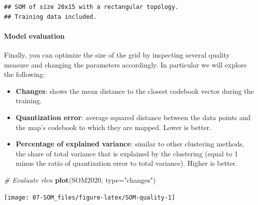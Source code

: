 \documentclass[
]{article}
\newenvironment{Shaded}{\begin{snugshade}}{\end{snugshade}}
\newcommand{\AttributeTok}[1]{\textcolor[rgb]{0.13,0.29,0.53}{#1}}
\newcommand{\CommentTok}[1]{\textcolor[rgb]{0.56,0.35,0.01}{\textit{#1}}}
\newcommand{\DocumentationTok}[1]{\textcolor[rgb]{0.56,0.35,0.01}{\textbf{\textit{#1}}}}
\newcommand{\FunctionTok}[1]{\textcolor[rgb]{0.13,0.29,0.53}{\textbf{#1}}}
\newcommand{\NormalTok}[1]{#1}
\newcommand{\OtherTok}[1]{\textcolor[rgb]{0.56,0.35,0.01}{#1}}
\newcommand{\SpecialCharTok}[1]{\textcolor[rgb]{0.81,0.36,0.00}{\textbf{#1}}}
\newcommand{\StringTok}[1]{\textcolor[rgb]{0.31,0.60,0.02}{#1}}
\providecommand{\tightlist}{%
  \setlength{\itemsep}{0pt}\setlength{\parskip}{0pt}}
\begin{document}
\begin{verbatim}
## SOM of size 20x15 with a rectangular topology.
## Training data included.
\end{verbatim}

\paragraph{Model evaluation}\label{model-evaluation-1}

Finally, you can optimize the size of the grid by inspecting several quality measure and changing the parameters accordingly.
In particular we will explore the following:

\begin{itemize}
\tightlist
\item
  \textbf{Changes}: shows the mean distance to the closest codebook vector during the training.
\item
  \textbf{Quantization error}: average squared distance between the data points and the map's codebook to which they are mapped. Lower is better.
\item
  \textbf{Percentage of explained variance}: similar to other clustering methods, the share of total variance that is explained by the clustering (equal to 1 minus the ratio of quantization error to total variance). Higher is better.
\end{itemize}

\begin{Shaded}
\begin{Highlighting}[]
\CommentTok{\# Evaluate rlen}
\FunctionTok{plot}\NormalTok{(SOM2020, }\AttributeTok{type=}\StringTok{"changes"}\NormalTok{)}
\end{Highlighting}
\end{Shaded}

\begin{center}\texttt{[image: 07-SOM\_files/figure-latex/SOM-quality-1]} \end{center}

\begin{Shaded}
\end{Shaded}
\end{document}
